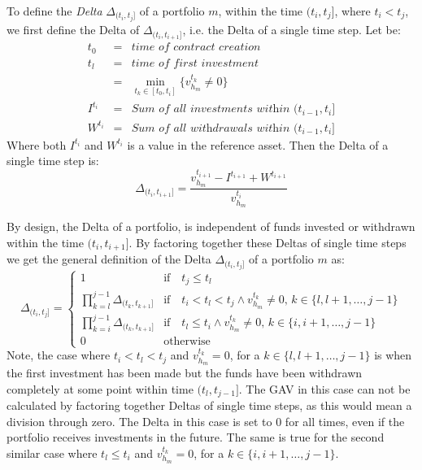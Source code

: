 \documentclass[9pt,oneside]{amsart}
\theoremstyle{plain}
\begin{document}
To define the \textit{Delta} $\Delta_{(t_i, t_j]}$ of a portfolio $m$, within the time $(t_i, t_j]$, where $t_i < t_j$, we first define the Delta of $\Delta_{(t_i, t_{i+1}]}$, i.e. the Delta of a single time step.
Let be:
\begin{eqnarray*}
	t_0 &=& \textit{time of contract creation} \\
	t_l &=& \textit{time of first investment} \\
	&=& \min_{t_k \in [t_0, t_i]} \{v_{h_m}^{t_k} \neq 0\} \\
	I^{t_i} &=& \textit{Sum of all investments within $(t_{i-1}, t_i]$} \\
	W^{t_i} &=& \textit{Sum of all withdrawals within $(t_{i-1}, t_i]$}
\end{eqnarray*}
Where both $I^{t_i}$ and $W^{t_i}$ is a value in the reference asset. Then the Delta of a single time step is:
\begin{equation}
	\Delta_{(t_i, t_{i+1}]} = 
		\frac{v_{h_m}^{t_{i+1}} - 
			I^{t_{i +1}} + W^{t_{i +1}}}{v_{h_m}^{t_i}}
\end{equation}

By design, the Delta of a portfolio, is independent of funds invested or withdrawn within the time $(t_i, t_{i+1}]$. By factoring together these Deltas of single time steps we get the general definition of the Delta $\Delta_{(t_i, t_j]}$ of a portfolio $m$ as:
\begin{equation}
	\Delta_{(t_i, t_j]} = \begin{cases}
		1 & \text{if} \quad t_j \leq t_l \\
		\prod\limits_{k = l}^{j - 1} \Delta_{(t_k, t_{k + 1}]} & \text{if} \quad t_i < t_l < t_j \wedge  v_{h_m}^{t_k} \neq 0, \, k \in \{l, l + 1, \hdots, j - 1\}\\
		\prod\limits_{k = i}^{j - 1} \Delta_{(t_k, t_{k + 1}]} & \text{if} \quad t_l \leq t_i \wedge  v_{h_m}^{t_k} \neq 0, \, k \in \{i, i + 1, \hdots, j - 1\}\\
		0 & \text{otherwise}
	\end{cases}
\end{equation}
Note, the case where $t_i < t_l < t_j$ and $v_{h_m}^{t_k} = 0$, for a $k \in \{l, l + 1, \hdots, j - 1\}$ is when the first investment has been made but the funds have been withdrawn completely at some point within time $(t_l, t_{j-1}]$. The GAV in this case can not be calculated by factoring together Deltas of single time steps, as this would mean a division through zero. The Delta in this case is set to $0$ for all times, even if the portfolio receives investments in the future. The same is true for the second similar case where $t_l \leq t_i$ and $v_{h_m}^{t_k} = 0$, for a $k \in \{i, i + 1, \hdots, j - 1\}$.
\end{document}

